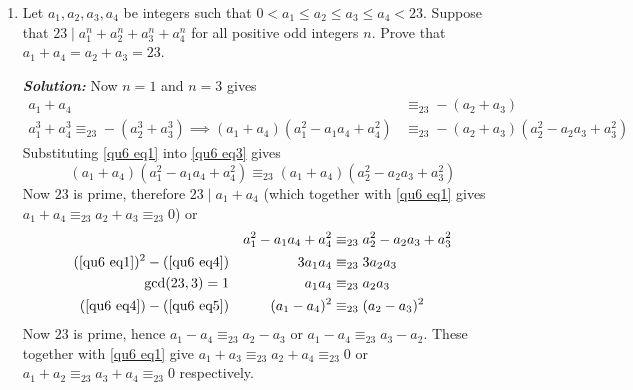\documentclass[11pt]{article}
\newcommand{\sol}{\textbf{\textit{Solution: }}}
\begin{document}
\begin{enumerate}[topsep=\bigskipamount,itemsep=\bigskipamount,leftmargin=0pt]
\sol
Clearly $\angle DPE = \angle BAD = \angle DCE$ implies $DPCE$ is cyclic.
Thus $\angle AEB = 90^{\circ}$ is equivalent to proving $\angle DPC = 90^{\circ}$, and since $DP$ is the angle bisector of $\angle FPE$, this is equivalent to proving that $(F, E; D, C) = 1$ (showing that $F, E, D, C$ is a harmonic bundle).
Since $\angle DQX = \angle CQY$, we know that $FO$ is the external bisector of $\angle Q$ in $\triangle QDC$.
Thus, to show $(F, E; D, C) = 1$, it suffices to show $QE$ bisects $\angle DQC$ which is equivalent to showing that $EQ \perp FO$.
To show that $EQ\perp FO$, we will use poles and polars with respect to the circumcircle of $ABCD$.
Clearly, from the polar properties of complete quadrilateral $ABCDEF$, we have that $E$ lies on the polar of $F$.
Extend $CQ$ to meet the circumcircle of $ABCD$ at $W$.
Then since $FO$ bisects $\angle WQD$ and $OD = OR$, we get via applying the sin rule to triangles $DQO$ and $RQO$, that $\angle ORQ = \angle ODQ$.
But $OR = OC\implies \angle ORQ = \angle OCQ$ and so $QOCD$ is cyclic and $\operatorname{pow}(F, (A, B, C, D)) = FD\cdot FC = FQ\cdot FO$; thus inversion about $(A, B, C, D)$ swaps $Q$ and $F$ thus $Q$ is on the polar of $F$.
So $EQ$ is the polar of $F$ and thus $EQ \perp FO$.
We are then done by the above work. 

\item 
Let $a_1, a_2, a_3, a_4$ be integers such that $0 < a_1 \leqslant a_2 \leqslant a_3 \leqslant a_4 < 23$.
Suppose that $23 \mid a_1^n+a_2^n+a_3^n+a_4^n$ for all positive odd integers $n$.
Prove that $a_1+a_4 = a_2+a_3 = 23$.

\sol
Now $n=1$ and $n=3$ gives
\begin{align}
    a_1+a_4 &\equiv_{23} -(a_2+a_3) \label{qu6 eq1} \\
    a_1^3+a_4^3 \equiv_{23} -(a_2^3+a_3^3) \implies (a_1+a_4)(a_1^2-a_1 a_4+a_4^2) &\equiv_{23} -(a_2+a_3)(a_2^2-a_2 a_3 + a_3^2) \label{qu6 eq3}
\end{align}
Substituting \eqref{qu6 eq1} into \eqref{qu6 eq3} gives
$$(a_1+a_4)(a_1^2-a_1 a_4+a_4^2)\equiv_{23}(a_1+a_4)(a_2^2-a_2 a_3 + a_3^2)$$
Now $23$ is prime, therefore $23 \mid a_1+a_4$ (which together with \eqref{qu6 eq1} gives $a_1+a_4 \equiv_{23} a_2+a_3 \equiv_{23} 0$) or
\begin{align}
    && a_1^2-a_1 a_4+a_4^2&\equiv_{23} a_2^2-a_2 a_3 +  a_3^2\label{qu6 eq4} \\
    (\ref{qu6 eq1})^2 - (\ref{qu6 eq4}) && 3a_1 a_4 &\equiv_{23} 3a_2 a_3\nonumber \\
    \gcd(23,3)=1 && a_1 a_4 &\equiv_{23} a_2 a_3\label{qu6 eq5} \\
    (\ref{qu6 eq4})  - (\ref{qu6 eq5}) &&  (a_1-a_4)^2 &\equiv_{23} (a_2-a_3)^2\nonumber
\end{align}
Now $23$ is prime, hence $a_1-a_4 \equiv_{23} a_2-a_3$ or $a_1-a_4 \equiv_{23} a_3-a_2$.
These together with \eqref{qu6 eq1} give $a_1+a_3 \equiv_{23} a_2+a_4 \equiv_{23} 0$ or $a_1+a_2\equiv_{23} a_3+a_4 \equiv_{23} 0$ respectively.


\end{enumerate}
\end{document}
